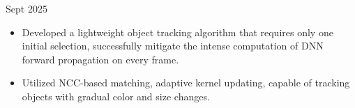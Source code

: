 \documentclass[a4paper,11pt]{article}
\newcommand{\MYhref}[3][black]{\href{#2}{\color{#1}{#3}}}%
\begin{document}





\textbf{\MYhref{https://github.com/Marcobisky/YOPO}{YOPO: You Only Pick Once -- Light Object Tracking Algorithm}} \hfill Sept 2025

\begin{itemize}
    \setlength\itemsep{-0.5em}
    \item Developed a lightweight object tracking algorithm that requires only one initial selection, successfully mitigate the intense computation of DNN forward propagation on every frame.
    \item Utilized NCC-based matching, adaptive kernel updating, capable of tracking objects with gradual color and size changes.
\end{itemize}


\end{document}
